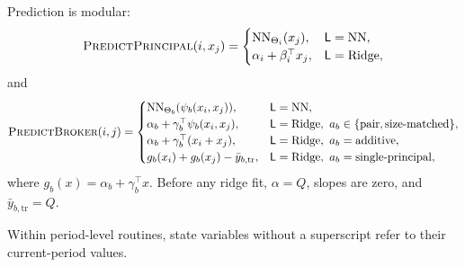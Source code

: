 \documentclass[11pt]{article}
\newcommand{\procPredictPrincipal}{PredictPrincipal}
\newcommand{\procPredictBroker}{PredictBroker}
\begin{document}
Prediction is modular:
\[
\Call{\procPredictPrincipal}{i,x_j}=\begin{cases}
\mathrm{NN}_{\Theta_i}(x_j), & \mathsf L=\mathrm{NN},\\
\alpha_i+\beta_i^\top x_j, & \mathsf L=\mathrm{Ridge},
\end{cases}
\]
and
\[
\Call{\procPredictBroker}{i,j}=\begin{cases}
\mathrm{NN}_{\Theta_b}(\psi_b(x_i,x_j)), & \mathsf L=\mathrm{NN},\\
\alpha_b+\gamma_b^\top\psi_b(x_i,x_j), & \mathsf L=\mathrm{Ridge},\ a_b\in\{\mathrm{pair},\mathrm{size\mbox{-}matched}\},\\
\alpha_b+\gamma_b^\top(x_i+x_j), & \mathsf L=\mathrm{Ridge},\ a_b=\mathrm{additive},\\
g_b(x_i)+g_b(x_j)-\bar y_{b,\mathrm{tr}}, & \mathsf L=\mathrm{Ridge},\ a_b=\mathrm{single\mbox{-}principal},
\end{cases}
\]
where $g_b(x)=\alpha_b+\gamma_b^\top x$. Before any ridge fit, $\alpha=Q$, slopes are zero, and $\bar y_{b,\mathrm{tr}}=Q$.

Within period-level routines, state variables without a superscript refer to their current-period values.
\end{document}

